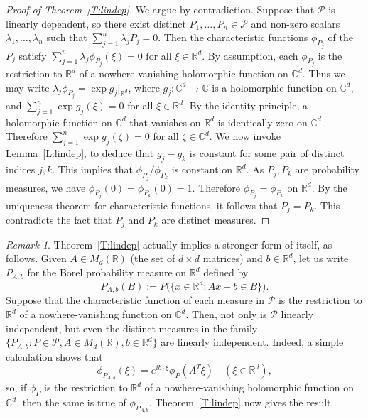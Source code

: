 \documentclass[11pt]{amsart}
\theoremstyle{plain}
\theoremstyle{remark}
\newtheorem*{remark}{Remark}
\newcommand{\CC}{\mathbb{C}}
\newcommand{\RR}{\mathbb{R}}
\newcommand{\cP}{\mathcal{P}}
\begin{document}
\begin{proof}[Proof of Theorem~\ref{T:lindep}]
We argue by contradiction. Suppose that $\cP$ is linearly dependent, so
there exist distinct $P_1,\dots,P_n\in\cP$ and non-zero scalars $\lambda_1,\dots,\lambda_n$
such that $\sum_{j=1}^n\lambda_j P_j=0$. Then the characteristic functions $\phi_{P_j}$ of the $P_j$
satisfy $\sum_{j=1}^n \lambda_j\phi_{P_j}(\xi)=0$ for all $\xi\in\RR^d$.
By assumption, each $\phi_{P_j}$ is the restriction to $\RR^d$ of a nowhere-vanishing
holomorphic function on $\CC^d$. Thus we may write $\lambda_j \phi_{P_j}=\exp g_j|_{\RR^d}$,
where $g_j:\CC^d\to\CC$ is a holomorphic function on $\CC^d$,
and $\sum_{j=1}^n\exp g_j(\xi)=0$ for all $\xi\in\RR^d$.
By the identity principle, a holomorphic function on $\CC^d$ that vanishes on $\RR^d$ 
is identically zero on $\CC^d$. Therefore $\sum_{j=1}^n\exp g_j(\zeta)=0$ for all $\zeta\in\CC^d$.
We now invoke Lemma~\ref{L:lindep}, to deduce that $g_j-g_k$ is constant for some pair of distinct indices $j,k$.
This implies that $\phi_{P_j}/\phi_{P_k}$ is constant on $\RR^d$. 
As $P_j,P_k$ are probability measures,
we have $\phi_{P_j}(0)=\phi_{P_k}(0)=1$. Therefore $\phi_{P_j}=\phi_{P_k}$ on $\RR^d$.
By the uniqueness theorem for characteristic functions, it follows that $P_j=P_k$.
This contradicts the fact that $P_j$ and $P_k$ are distinct measures.
\end{proof}
		
\begin{remark}
Theorem~\ref{T:lindep} actually implies a stronger form of itself, as follows.
Given $A\in M_d(\RR)$ (the set of $d\times d$ matrices)
and $b\in\RR^d$, let us write $P_{A,b}$ 
for the Borel probability measure on $\RR^d$ defined by
\begin{equation}\label{E:affine}
P_{A,b}(B):=P\bigl(\{x\in\RR^d: Ax+b\in B\}\bigr).
\end{equation}
Suppose that the characteristic function of each measure in $\cP$ 
is the restriction to $\RR^d$ of a nowhere-vanishing function on $\CC^d$.
Then, not only is $\cP$ linearly independent, 
but even the distinct measures in the family 
$\{P_{A,b}:P\in\cP, A\in M_d(\RR), b\in\RR^d\}$ are linearly independent.
Indeed, a simple calculation shows that
\[
\phi_{P_{A,b}}(\xi)=e^{ib\cdot \xi}\phi_P(A^T\xi)\quad(\xi\in\RR^d),
\]
so, if $\phi_P$ is the restriction to $\RR^d$ of a nowhere-vanishing
holomorphic function on $\CC^d$, then the same is true of 
$\phi_{P_{A,b}}$. Theorem~\ref{T:lindep} now gives the result.
\end{remark}
	
\end{document}
